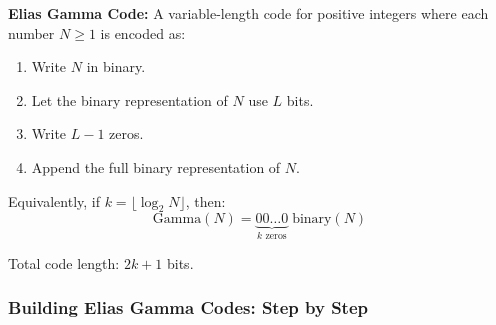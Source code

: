 \begin{definitionbox}
\textbf{Elias Gamma Code:} A variable-length code for positive integers where each number $N \ge 1$ is encoded as:
\begin{enumerate}
    \item Write $N$ in binary.
    \item Let the binary representation of $N$ use $L$ bits.
    \item Write $L-1$ zeros.
    \item Append the full binary representation of $N$.
\end{enumerate}

Equivalently, if $k = \lfloor \log_2 N \rfloor$, then:
\[
\text{Gamma}(N) = \underbrace{00\ldots0}_{k \text{ zeros}} \; \text{binary}(N)
\]

Total code length: $2k + 1$ bits.
\end{definitionbox}

\subsubsection*{Building Elias Gamma Codes: Step by Step}


